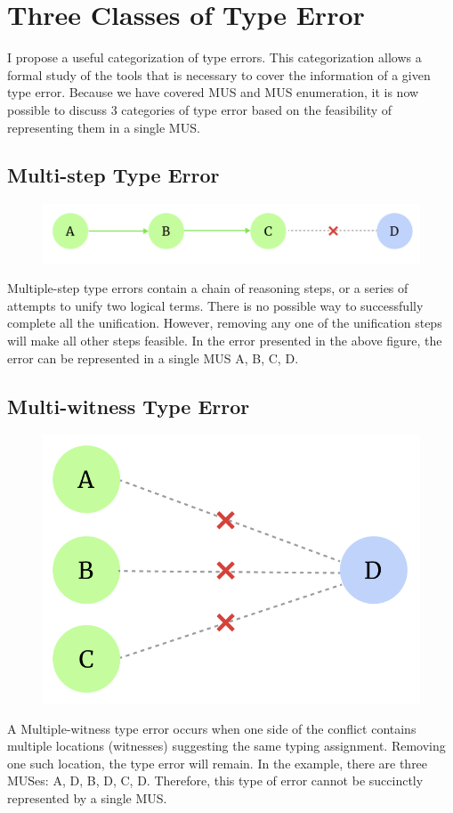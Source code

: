 \section{Three Classes of Type Error}

I propose a useful categorization of type errors. This categorization allows a formal study of the tools that is necessary to cover the information of a given type error.  Because we have covered MUS and MUS enumeration, it is now possible to discuss 3 categories of type error based on the feasibility of representing them in a single MUS.

\subsection{Multi-step Type Error}
\begin{figure}[hbt]
  \includegraphics[width=0.5\linewidth]{Multi-step}
  \caption{}
\end{figure}

Multiple-step type errors contain a chain of reasoning steps, or a series of attempts to unify two logical terms. There is no possible way to successfully complete all the unification. However, removing any one of the unification steps will make all other steps feasible. In the error presented in the above figure, the error can be represented in a single MUS {A, B, C, D}.

\subsection{Multi-witness Type Error}
\begin{figure}[hbt]
  \includegraphics[width=0.5\linewidth]{Multi-witness}
  \caption{}
\end{figure}
A Multiple-witness type error occurs when one side of the conflict contains multiple locations (witnesses) suggesting the same typing assignment. Removing one such location, the type error will remain. In the example, there are three MUSes: {A, D}, {B, D}, {C, D}. Therefore, this type of error cannot be succinctly represented by a single MUS.

